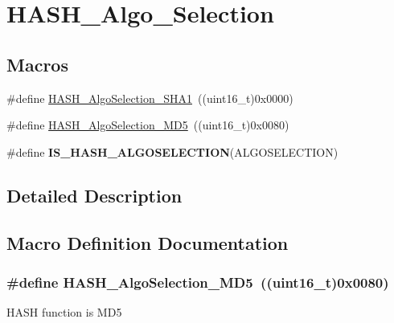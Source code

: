 \hypertarget{group___h_a_s_h___algo___selection}{\section{H\-A\-S\-H\-\_\-\-Algo\-\_\-\-Selection}
\label{group___h_a_s_h___algo___selection}
}
\subsection*{Macros}
\begin{DoxyCompactItemize}
\item 
\#define \hyperlink{group___h_a_s_h___algo___selection_gaa866d6ac9e86d2290b012681836f22d0}{H\-A\-S\-H\-\_\-\-Algo\-Selection\-\_\-\-S\-H\-A1}~((uint16\-\_\-t)0x0000)
\item 
\#define \hyperlink{group___h_a_s_h___algo___selection_gac443db7ebfff6d660b9321c59ecf48ed}{H\-A\-S\-H\-\_\-\-Algo\-Selection\-\_\-\-M\-D5}~((uint16\-\_\-t)0x0080)
\item 
\#define {\bfseries I\-S\-\_\-\-H\-A\-S\-H\-\_\-\-A\-L\-G\-O\-S\-E\-L\-E\-C\-T\-I\-O\-N}(A\-L\-G\-O\-S\-E\-L\-E\-C\-T\-I\-O\-N)
\end{DoxyCompactItemize}


\subsection{Detailed Description}


\subsection{Macro Definition Documentation}
\hypertarget{group___h_a_s_h___algo___selection_gac443db7ebfff6d660b9321c59ecf48ed}{
\subsubsection[{H\-A\-S\-H\-\_\-\-Algo\-Selection\-\_\-\-M\-D5}]{\setlength{\rightskip}{0pt plus 5cm}\#define H\-A\-S\-H\-\_\-\-Algo\-Selection\-\_\-\-M\-D5~((uint16\-\_\-t)0x0080)}}\label{group___h_a_s_h___algo___selection_gac443db7ebfff6d660b9321c59ecf48ed}
H\-A\-S\-H function is M\-D5 

